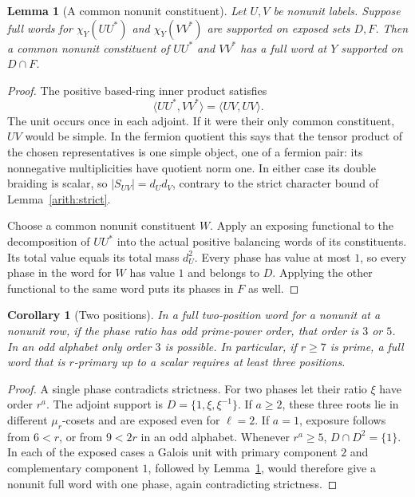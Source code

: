 \documentclass[11pt,a4paper]{article}
\numberwithin{equation}{section}
\newtheorem{lemma}[theorem]{Lemma}
\newtheorem{corollary}[theorem]{Corollary}
\begin{document}
\begin{lemma}[A common nonunit constituent]\label{supp:common}
Let $U,V$ be nonunit labels. Suppose full words for
$\chi_Y(UU^*)$ and $\chi_Y(VV^*)$ are supported on exposed
sets $D,F$. Then a common nonunit constituent of $UU^*$ and
$VV^*$ has a full word at $Y$ supported on $D\cap F$.
\end{lemma}
\begin{proof}
The positive based-ring inner product satisfies
\[
           \langle UU^*,VV^*\rangle=\langle UV,UV\rangle.
\]
The unit occurs once in each adjoint. If it were their only
common constituent, $UV$ would be simple. In the fermion
quotient this says that the tensor product of the chosen
representatives is one simple object, one of a fermion pair:
its nonnegative multiplicities have quotient norm one.
In either case its double braiding is scalar, so
$|S_{UV}|=d_Ud_V$, contrary to the strict character bound
of Lemma~\ref{arith:strict}.

Choose a common nonunit constituent $W$. Apply an exposing
functional to the decomposition of $UU^*$ into the actual
positive balancing words of its constituents. Its total
value equals its total mass $d_U^2$. Every phase has value
at most $1$, so every phase in the word for $W$ has value
$1$ and belongs to $D$. Applying the other functional to
the same word puts its phases in $F$ as well.
\end{proof}

\begin{corollary}[Two positions]\label{supp:two-position}
In a full two-position word for a nonunit at a nonunit row, if the
phase ratio has odd prime-power order, that order is $3$ or $5$.
In an odd alphabet only order $3$ is possible. In particular, if
$r\ge7$ is prime, a full word that is $r$-primary up to a scalar
requires at least three positions.
\end{corollary}
\begin{proof}
A single phase contradicts strictness. For two phases let
their ratio $\xi$ have order $r^a$. The adjoint support is
$D=\{1,\xi,\xi^{-1}\}$. If $a\ge2$, these three roots
lie in different $\mu_r$-cosets and are exposed even for
$\ell=2$. If $a=1$, exposure follows from $6<r$, or
from $9<2r$ in an odd alphabet. Whenever $r^a\ge5$,
$D\cap D^2=\{1\}$. In each of the exposed cases a Galois unit with
primary component $2$ and complementary component $1$, followed by
Lemma~\ref{supp:common}, would therefore give a nonunit
full word with one phase, again contradicting strictness.
\end{proof}
\end{document}
